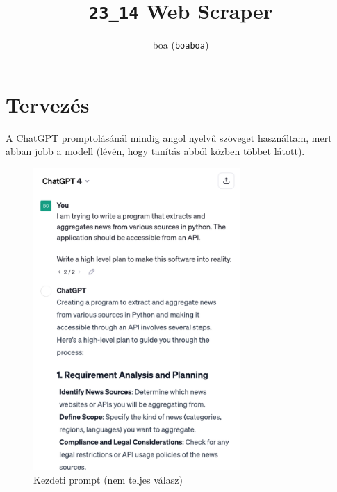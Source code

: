 \documentclass[]{article}
\title{\texttt{23\_14} Web Scraper}
\author{boa (\texttt{boaboa})}
\begin{document}
\maketitle

\begin{abstract}




\end{abstract}

\pagebreak

\section{Tervezés}

A ChatGPT promptolásánál mindig angol nyelvű szöveget használtam, mert abban jobb a modell (lévén, hogy tanítás abból közben többet látott).

\begin{figure}[H]
	\centering
	\includegraphics[width=0.7\textwidth]{prompt_1.pdf}
	\caption{Kezdeti prompt (nem teljes válasz)}
\end{figure}
\end{document}

